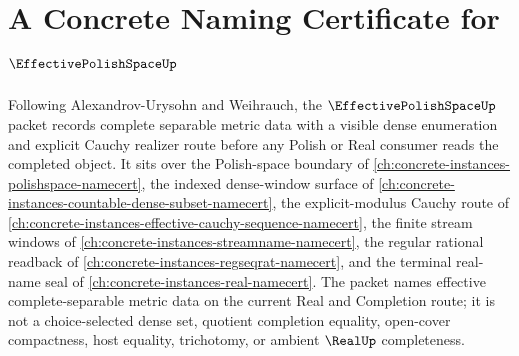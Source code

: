 \chapter{A Concrete Naming Certificate for $\EffectivePolishSpaceUp$}
\label{ch:concrete-instances-effective-polish-space-namecert}

Following Alexandrov-Urysohn and Weihrauch, the $\EffectivePolishSpaceUp$ packet records complete separable metric data with a visible dense enumeration and explicit Cauchy realizer route before any Polish or Real consumer reads the completed object. It sits over the Polish-space boundary of \autoref{ch:concrete-instances-polishspace-namecert}, the indexed dense-window surface of \autoref{ch:concrete-instances-countable-dense-subset-namecert}, the explicit-modulus Cauchy route of \autoref{ch:concrete-instances-effective-cauchy-sequence-namecert}, the finite stream windows of \autoref{ch:concrete-instances-streamname-namecert}, the regular rational readback of \autoref{ch:concrete-instances-regseqrat-namecert}, and the terminal real-name seal of \autoref{ch:concrete-instances-real-namecert}. The packet names effective complete-separable metric data on the current Real and Completion route; it is not a choice-selected dense set, quotient completion equality, open-cover compactness, host equality, trichotomy, or ambient $\RealUp$ completeness.


